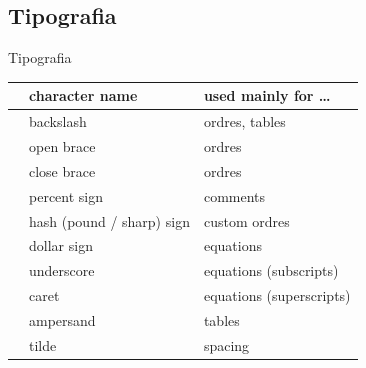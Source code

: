 \subsection{Tipografia}
\begin{frame}{Tipografia}
\begin{tabular}{lll}
& character name & used mainly for \dots \\\hline
\bftt{\bs} & backslash                 & ordres, tables \\
\bftt{\{}  & open brace                & ordres \\
\bftt{\}}  & close brace               & ordres \\
\bftt{\%}  & percent sign              & comments \\
\bftt{\#}  & hash (pound / sharp) sign & custom ordres \\
\bftt{\$}  & dollar sign               & equations \\
\bftt{\_}  & underscore                & equations (subscripts) \\
\bftt{\^}  & caret                     & equations (superscripts) \\
\bftt{\&}  & ampersand                 & tables \\
\bftt{\~}  & tilde                     & spacing \\
\end{tabular}
\end{frame}

